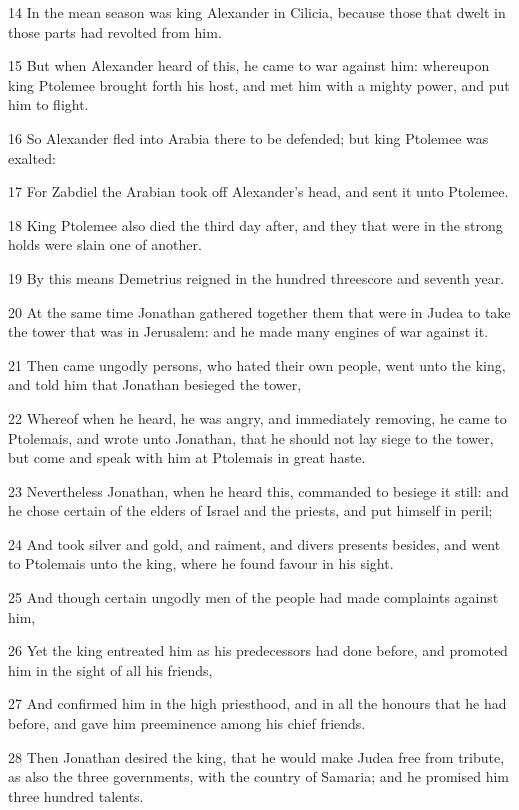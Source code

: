 \par 14 In the mean season was king Alexander in Cilicia, because those that dwelt in those parts had revolted from him.
\par 15 But when Alexander heard of this, he came to war against him: whereupon king Ptolemee brought forth his host, and met him with a mighty power, and put him to flight.
\par 16 So Alexander fled into Arabia there to be defended; but king Ptolemee was exalted:
\par 17 For Zabdiel the Arabian took off Alexander's head, and sent it unto Ptolemee.
\par 18 King Ptolemee also died the third day after, and they that were in the strong holds were slain one of another.
\par 19 By this means Demetrius reigned in the hundred threescore and seventh year.
\par 20 At the same time Jonathan gathered together them that were in Judea to take the tower that was in Jerusalem: and he made many engines of war against it.
\par 21 Then came ungodly persons, who hated their own people, went unto the king, and told him that Jonathan besieged the tower,
\par 22 Whereof when he heard, he was angry, and immediately removing, he came to Ptolemais, and wrote unto Jonathan, that he should not lay siege to the tower, but come and speak with him at Ptolemais in great haste.
\par 23 Nevertheless Jonathan, when he heard this, commanded to besiege it still: and he chose certain of the elders of Israel and the priests, and put himself in peril;
\par 24 And took silver and gold, and raiment, and divers presents besides, and went to Ptolemais unto the king, where he found favour in his sight.
\par 25 And though certain ungodly men of the people had made complaints against him,
\par 26 Yet the king entreated him as his predecessors had done before, and promoted him in the sight of all his friends,
\par 27 And confirmed him in the high priesthood, and in all the honours that he had before, and gave him preeminence among his chief friends.
\par 28 Then Jonathan desired the king, that he would make Judea free from tribute, as also the three governments, with the country of Samaria; and he promised him three hundred talents.
